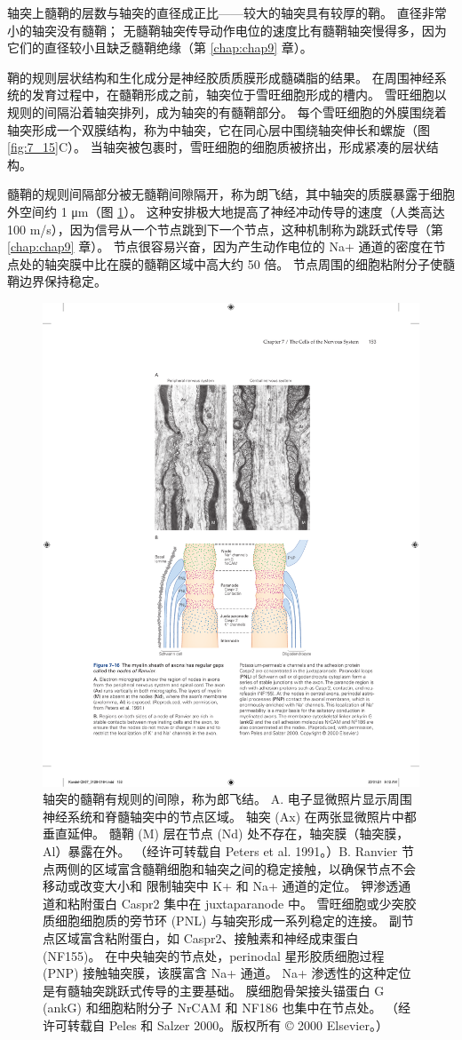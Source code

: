 轴突上髓鞘的层数与轴突的直径成正比——较大的轴突具有较厚的鞘。 
直径非常小的轴突没有髓鞘； 无髓鞘轴突传导动作电位的速度比有髓鞘轴突慢得多，因为它们的直径较小且缺乏髓鞘绝缘（第 \ref{chap:chap9} 章）。


鞘的规则层状结构和生化成分是神经胶质质膜形成髓磷脂的结果。 
在周围神经系统的发育过程中，在髓鞘形成之前，轴突位于雪旺细胞形成的槽内。 
雪旺细胞以规则的间隔沿着轴突排列，成为轴突的有髓鞘部分。 
每个雪旺细胞的外膜围绕着轴突形成一个双膜结构，称为中轴突，它在同心层中围绕轴突伸长和螺旋（图 \ref{fig:7_15}C）。 
当轴突被包裹时，雪旺细胞的细胞质被挤出，形成紧凑的层状结构。


髓鞘的规则间隔部分被无髓鞘间隙隔开，称为朗飞结，其中轴突的质膜暴露于细胞外空间约 1 μm（图 \ref{fig:7_16}）。 
这种安排极大地提高了神经冲动传导的速度（人类高达 100 m/s），因为信号从一个节点跳到下一个节点，这种机制称为跳跃式传导（第 \ref{chap:chap9} 章）。 
节点很容易兴奋，因为产生动作电位的 Na+ 通道的密度在节点处的轴突膜中比在膜的髓鞘区域中高大约 50 倍。 
节点周围的细胞粘附分子使髓鞘边界保持稳定。

\begin{figure}[htbp]
	\centering
	\includegraphics[width=0.6\linewidth]{chap07/fig_7_16}
	\caption{轴突的髓鞘有规则的间隙，称为郎飞结。 A. 电子显微照片显示周围神经系统和脊髓轴突中的节点区域。 轴突 (Ax) 在两张显微照片中都垂直延伸。 髓鞘 (M) 层在节点 (Nd) 处不存在，轴突膜（轴突膜，Al）暴露在外。 （经许可转载自 Peters et al. 1991。）B. Ranvier 节点两侧的区域富含髓鞘细胞和轴突之间的稳定接触，以确保节点不会移动或改变大小和 限制轴突中 K+ 和 Na+ 通道的定位。 钾渗透通道和粘附蛋白 Caspr2 集中在 juxtaparanode 中。 雪旺细胞或少突胶质细胞细胞质的旁节环 (PNL) 与轴突形成一系列稳定的连接。 副节点区域富含粘附蛋白，如 Caspr2、接触素和神经成束蛋白 (NF155)。 在中央轴突的节点处，perinodal 星形胶质细胞过程 (PNP) 接触轴突膜，该膜富含 Na+ 通道。 Na+ 渗透性的这种定位是有髓轴突跳跃式传导的主要基础。 膜细胞骨架接头锚蛋白 G (ankG) 和细胞粘附分子 NrCAM 和 NF186 也集中在节点处。 （经许可转载自 Peles 和 Salzer 2000。版权所有 © 2000 Elsevier。）}
	\label{fig:7_16}
\end{figure}


